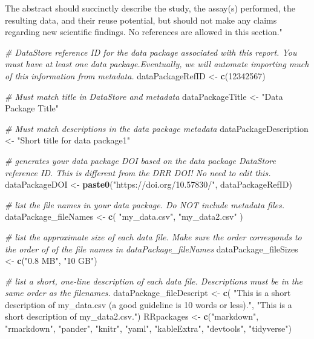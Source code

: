 \documentclass[
]{article}
\newenvironment{Shaded}{\begin{snugshade}}{\end{snugshade}}
\newcommand{\CommentTok}[1]{\textcolor[rgb]{0.56,0.35,0.01}{\textit{#1}}}
\newcommand{\DecValTok}[1]{\textcolor[rgb]{0.00,0.00,0.81}{#1}}
\newcommand{\FunctionTok}[1]{\textcolor[rgb]{0.13,0.29,0.53}{\textbf{#1}}}
\newcommand{\NormalTok}[1]{#1}
\newcommand{\OtherTok}[1]{\textcolor[rgb]{0.56,0.35,0.01}{#1}}
\newcommand{\StringTok}[1]{\textcolor[rgb]{0.31,0.60,0.02}{#1}}
\begin{document}
\begin{Shaded}
\begin{Highlighting}[]
\StringTok{The abstract should succinctly describe the study, the assay(s) performed, the resulting data, and their reuse potential, but should not make any claims regarding new scientific findings. No references are allowed in this section."}

\CommentTok{\# DataStore reference ID for the data package associated with this report. You must have at least one data package.Eventually, we will automate importing much of this information from metadata.}
\NormalTok{dataPackageRefID }\OtherTok{\textless{}{-}} \FunctionTok{c}\NormalTok{(}\DecValTok{12342567}\NormalTok{)}

\CommentTok{\# Must match title in DataStore and metadata}
\NormalTok{dataPackageTitle }\OtherTok{\textless{}{-}} \StringTok{"Data Package Title"}

\CommentTok{\# Must match descriptions in the data package metadata}
\NormalTok{dataPackageDescription }\OtherTok{\textless{}{-}} \StringTok{"Short title for data package1"}

\CommentTok{\# generates your data package DOI based on the data package DataStore reference ID. This is different from the DRR DOI! No need to edit this.}
\NormalTok{dataPackageDOI }\OtherTok{\textless{}{-}} \FunctionTok{paste0}\NormalTok{(}\StringTok{"https://doi.org/10.57830/"}\NormalTok{, dataPackageRefID)}

\CommentTok{\# list the file names in your data package. Do NOT include metadata files.}
\NormalTok{dataPackage\_fileNames }\OtherTok{\textless{}{-}} \FunctionTok{c}\NormalTok{(}
  \StringTok{"my\_data.csv"}\NormalTok{,}
  \StringTok{"my\_data2.csv"}
\NormalTok{)}

\CommentTok{\# list the approximate size of each data file. Make sure the order corresponds to the order of of the file names in dataPackage\_fileNames}
\NormalTok{dataPackage\_fileSizes }\OtherTok{\textless{}{-}} \FunctionTok{c}\NormalTok{(}\StringTok{"0.8 MB"}\NormalTok{, }\StringTok{"10 GB"}\NormalTok{)}

\CommentTok{\# list a short, one{-}line description of each data file. Descriptions must be in the same order as the filenames.}
\NormalTok{dataPackage\_fileDescript }\OtherTok{\textless{}{-}} \FunctionTok{c}\NormalTok{(}
  \StringTok{"This is a short description of my\_data.csv (a good guideline is 10 words or less)."}\NormalTok{,}
  \StringTok{"This is a short description of my\_data2.csv."}\NormalTok{)}
\NormalTok{RRpackages }\OtherTok{\textless{}{-}} \FunctionTok{c}\NormalTok{(}\StringTok{"markdown"}\NormalTok{,}
                \StringTok{"rmarkdown"}\NormalTok{,}
                \StringTok{"pander"}\NormalTok{,}
                \StringTok{"knitr"}\NormalTok{,}
                \StringTok{"yaml"}\NormalTok{,}
                \StringTok{"kableExtra"}\NormalTok{,}
                \StringTok{"devtools"}\NormalTok{,}
                \StringTok{"tidyverse"}\NormalTok{)}


\end{Highlighting}
\end{Shaded}
\end{document}
